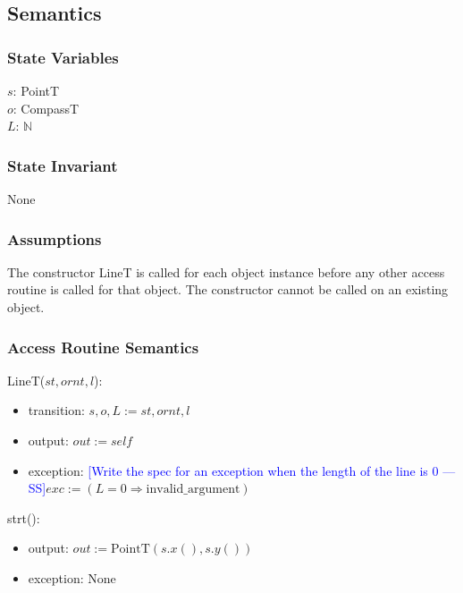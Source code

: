 \documentclass[12pt]{article}
\newcommand{\authornote}[3]{\textcolor{#1}{[#3 ---#2]}}
\newcommand{\authornote}[3]{}
\newcommand{\wss}[1]{\authornote{blue}{SS}{#1}}
\begin{document}
\subsection* {Semantics}

\subsubsection* {State Variables}

$s$: PointT\\
$o$: CompassT\\
$L$: $\mathbb{N}$\\ 

\subsubsection* {State Invariant}

None

\subsubsection* {Assumptions}

The constructor LineT is called for each object instance before any other
access routine is called for that object.  The constructor cannot be called on
an existing object.

\subsubsection* {Access Routine Semantics}

LineT($st, ornt, l$):
\begin{itemize}
\item transition: $s, o, L := st, ornt, l$
\item output: $out := \mathit{self}$
\item exception: \wss{Write the spec for an exception when the length of the line is 0}$exc := (L = 0 \Rightarrow \mathrm{invalid\_argument})$
\end{itemize}

\noindent strt():
\begin{itemize}
\item output: $out := \mbox{PointT}(s.x(), s.y())$
\item exception: None
\end{itemize}
\end{document}
